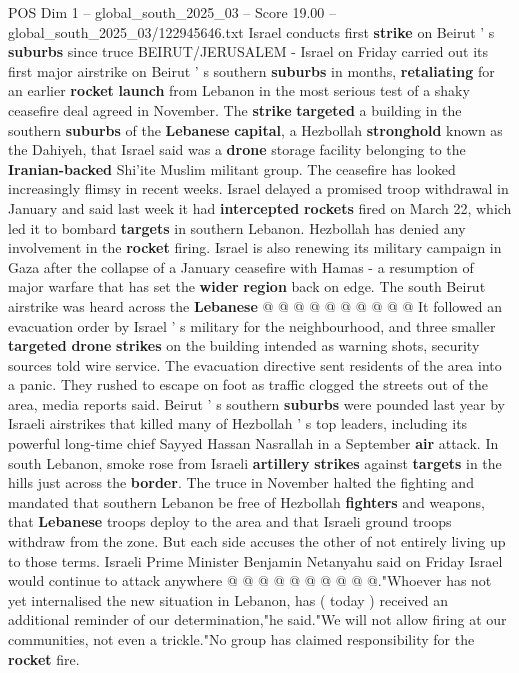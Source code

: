 \begin{textsample}{POS Dim 1 – global\_south\_2025\_03 – Score 19.00 – global\_south\_2025\_03/122945646.txt}  \label{ex:f1_pos_294}
Israel conducts first \textbf{strike} on Beirut ' s \textbf{suburbs} since truce BEIRUT/JERUSALEM - Israel on Friday carried out its first major airstrike on Beirut ' s southern \textbf{suburbs} in months, \textbf{retaliating} for an earlier \textbf{rocket} \textbf{launch} from Lebanon in the most serious test of a shaky ceasefire deal agreed in November.
The \textbf{strike} \textbf{targeted} a building in the southern \textbf{suburbs} of the \textbf{Lebanese} \textbf{capital}, a Hezbollah \textbf{stronghold} known as the Dahiyeh, that Israel said was a \textbf{drone} storage facility belonging to the \textbf{Iranian-backed} Shi'ite Muslim militant group.
The ceasefire has looked increasingly flimsy in recent weeks.
Israel delayed a promised troop withdrawal in January and said last week it had \textbf{intercepted} \textbf{rockets} fired on March 22, which led it to bombard \textbf{targets} in southern Lebanon.
Hezbollah has denied any involvement in the \textbf{rocket} firing.
Israel is also renewing its military campaign in Gaza after the collapse of a January ceasefire with Hamas - a resumption of major warfare that has set the \textbf{wider} \textbf{region} back on edge.
The south Beirut airstrike was heard across the \textbf{Lebanese} @ @ @ @ @ @ @ @ @ @ It followed an evacuation order by Israel ' s military for the neighbourhood, and three smaller \textbf{targeted} \textbf{drone} \textbf{strikes} on the building intended as warning shots, security sources told wire service.
The evacuation directive sent residents of the area into a panic.
They rushed to escape on foot as traffic clogged the streets out of the area, media reports said.
Beirut ' s southern \textbf{suburbs} were pounded last year by Israeli airstrikes that killed many of Hezbollah ' s top leaders, including its powerful long-time chief Sayyed Hassan Nasrallah in a September \textbf{air} attack.
In south Lebanon, smoke rose from Israeli \textbf{artillery} \textbf{strikes} against \textbf{targets} in the hills just across the \textbf{border}.
The truce in November halted the fighting and mandated that southern Lebanon be free of Hezbollah \textbf{fighters} and weapons, that \textbf{Lebanese} troops deploy to the area and that Israeli ground troops withdraw from the zone.
But each side accuses the other of not entirely living up to those terms.
Israeli Prime Minister Benjamin Netanyahu said on Friday Israel would continue to attack anywhere @ @ @ @ @ @ @ @ @ @."Whoever has not yet internalised the new situation in Lebanon, has ( today ) received an additional reminder of our determination,"he said."We will not allow firing at our communities, not even a trickle."No group has claimed responsibility for the \textbf{rocket} fire.

\end{textsample}
